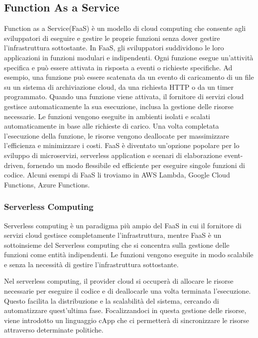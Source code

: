 \documentclass[../../main.tex]{subfiles}
\begin{document}
\subsection{Function As a  Service}
Function as a Service(FaaS) è un modello di cloud computing che consente agli sviluppatori di eseguire e gestire le proprie funzioni senza dover gestire l'infrastruttura sottostante.
In FaaS, gli sviluppatori suddividono le loro applicazioni in funzioni modulari e indipendenti. Ogni funzione esegue un'attività specifica e può essere attivata in risposta a eventi o richieste specifiche. Ad esempio, una funzione può essere scatenata da un evento di caricamento di un file su un sistema di archiviazione cloud, da una richiesta HTTP o da un timer programmato. Quando una funzione viene attivata, il fornitore di servizi cloud gestisce automaticamente la sua esecuzione, inclusa la gestione delle risorse necessarie. Le funzioni vengono eseguite in ambienti isolati e scalati automaticamente in base alle richieste di carico. Una volta completata l'esecuzione della funzione, le risorse vengono deallocate per massimizzare l'efficienza e minimizzare i costi.
FaaS è diventato un'opzione popolare per lo sviluppo di microservizi, serverless application e scenari di elaborazione event-driven, fornendo un modo flessibile ed efficiente per eseguire singole funzioni di codice.
Alcuni esempi di FaaS li troviamo in AWS Lambda, Google Cloud Functions, Azure Functions.

\subsubsection{Serverless Computing}
Serverless computing è un paradigma più ampio del FaaS in cui il fornitore di servizi cloud gestisce completamente l'infrastruttura, mentre FaaS è un sottoinsieme del Serverless computing che si concentra sulla gestione delle funzioni come entità indipendenti. Le funzioni vengono eseguite in modo scalabile e senza la necessità di gestire l'infrastruttura sottostante.
\autocite{amslaurea24930}

Nel serverless computing, il provider cloud si occuperà di allocare le risorse necessarie per eseguire il codice e di deallocarle una volta terminata l'esecuzione. Questo facilita la distribuzione e la scalabilità del sistema, cercando di automatizzare quest'ultima fase.
Focalizzandoci in questa gestione delle risorse, viene introdotto un linguaggio cApp che ci permetterà di sincronizzare le risorse attraverso determinate politiche.
\end{document}
